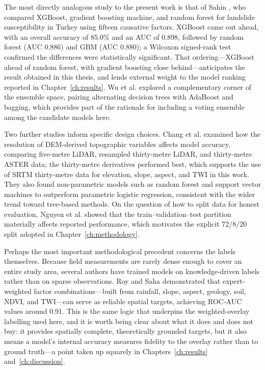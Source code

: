 The most directly analogous study to the present work is that of Sahin
\cite{sahin2020ensembletree}, who compared XGBoost, gradient boosting machine,
and random forest for landslide susceptibility in Turkey using fifteen causative
factors. XGBoost came out ahead, with an overall accuracy of 85.0\% and an AUC
of 0.898, followed by random forest (AUC 0.886) and GBM (AUC 0.880); a Wilcoxon
signed-rank test confirmed the differences were statistically significant. That
ordering---XGBoost ahead of random forest, with gradient boosting close
behind---anticipates the result obtained in this thesis, and lends external
weight to the model ranking reported in Chapter~\ref{ch:results}. Wu et al.
\cite{wu2019adaboost} explored a complementary corner of the ensemble space,
pairing alternating decision trees with AdaBoost and bagging, which provides part
of the rationale for including a voting ensemble among the candidate models here.

Two further studies inform specific design choices. Chang et al.
\cite{chang2019scaleeffects} examined how the resolution of DEM-derived
topographic variables affects model accuracy, comparing five-metre LiDAR,
resampled thirty-metre LiDAR, and thirty-metre ASTER data; the thirty-metre
derivatives performed best, which supports the use of SRTM thirty-metre data for
elevation, slope, aspect, and TWI in this work. They also found non-parametric
models such as random forest and support vector machines to outperform
parametric logistic regression, consistent with the wider trend toward tree-based
methods. On the question of how to split data for honest evaluation, Nguyen et
al. \cite{nguyen2021datasplitting} showed that the train--validation--test
partition materially affects reported performance, which motivates the explicit
72/8/20 split adopted in Chapter~\ref{ch:methodology}.

Perhaps the most important methodological precedent concerns the labels
themselves. Because field measurements are rarely dense enough to cover an entire
study area, several authors have trained models on knowledge-driven labels rather
than on sparse observations. Roy and Saha \cite{roy2019knowledgedriven}
demonstrated that expert-weighted factor combinations---built from rainfall,
slope, aspect, geology, soil, NDVI, and TWI---can serve as reliable spatial
targets, achieving ROC-AUC values around 0.91. This is the same logic that
underpins the weighted-overlay labelling used here, and it is worth being clear
about what it does and does not buy: it provides spatially complete, theoretically
grounded targets, but it also means a model's internal accuracy measures fidelity
to the overlay rather than to ground truth---a point taken up squarely in
Chapters~\ref{ch:results} and~\ref{ch:discussion}.

